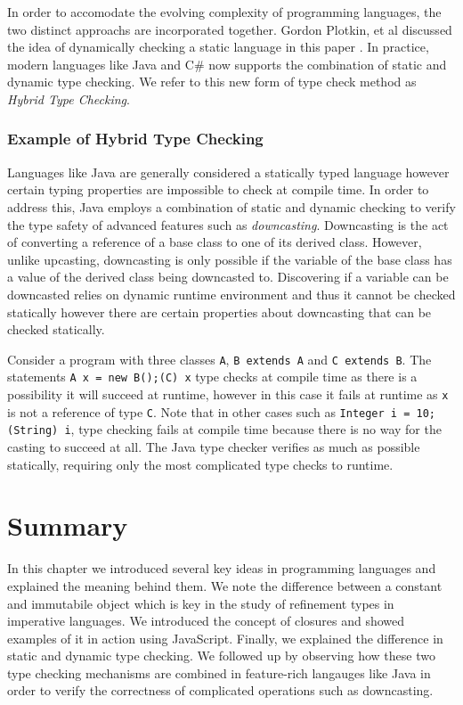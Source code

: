 \documentclass[a4paper,12pt]{report}
\begin{document}
\par
In order to accomodate the evolving complexity of programming languages, the two 
distinct approachs are incorporated together. Gordon Plotkin, et al discussed the 
idea of dynamically checking a static language in this paper 
\cite{dynamicCheckStaticLanguage}. In practice, modern languages like 
Java and C# now supports the combination of static and dynamic type checking. 
We refer to this new form of type check method as \emph{Hybrid Type Checking}.

\subsubsection{Example of Hybrid Type Checking}
Languages like Java are generally considered a statically typed language  
however certain typing properties are impossible to check at compile time. In 
order to address this, Java employs a combination of static and dynamic checking 
to verify the type safety of advanced features such as \emph{downcasting}. 
Downcasting is the act of converting a reference of a base class to one of its 
derived class. However, unlike upcasting, downcasting is only possible if the 
variable of the base class has a value of the derived class being downcasted to. 
Discovering if a variable can be downcasted relies on dynamic runtime 
environment and thus it cannot be checked statically however there are certain 
properties about downcasting that can be checked statically.

\par
Consider a program with three classes \verb|A|, \verb|B extends A| and 
\verb|C extends B|. The statements \verb|A x = new B();(C) x| 
type checks at compile time as there is a possibility it will succeed at 
runtime, however in this case it fails at runtime as \verb|x| is not a reference of 
type \verb|C|. Note that in other cases such as \verb|Integer i = 10; (String) i|, 
type checking fails at compile time because there is no way for the casting to 
succeed at all. The Java type checker verifies as much as possible 
statically, requiring only the most complicated type checks to runtime. 

\section{Summary}
In this chapter we introduced several key ideas in programming languages and 
explained the meaning behind them. We note the difference between a constant and 
immutabile object which is key in the study of refinement types in 
imperative languages. We introduced the concept of closures and showed examples 
of it in action using JavaScript. Finally, we explained the difference in static 
and dynamic type checking. We followed up by observing how these two type 
checking mechanisms are combined in feature-rich langauges like Java in order to 
verify the correctness of complicated operations such as downcasting. 
\end{document}
